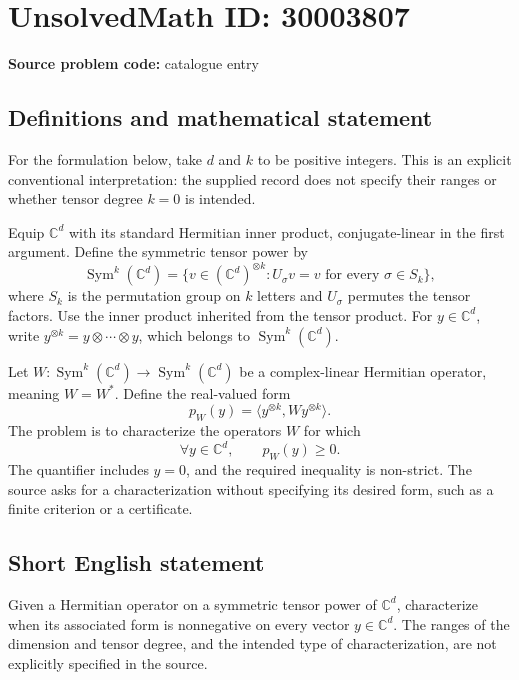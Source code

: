 \documentclass[11pt]{article}
\newcommand{\C}{\mathbb{C}}
\begin{document}
\section*{UnsolvedMath ID: 30003807}
\textbf{Source problem code:} catalogue entry
\subsection{Definitions and mathematical statement}
For the formulation below, take \(d\) and \(k\) to be positive integers. This is an explicit conventional interpretation: the supplied record does not specify their ranges or whether tensor degree \(k=0\) is intended.

Equip \(\C^d\) with its standard Hermitian inner product, conjugate-linear in the first argument. Define the symmetric tensor power by
\[
\operatorname{Sym}^k(\C^d)=\{v\in(\C^d)^{\otimes k}:U_\sigma v=v\text{ for every }\sigma\in S_k\},
\]
where \(S_k\) is the permutation group on \(k\) letters and \(U_\sigma\) permutes the tensor factors. Use the inner product inherited from the tensor product. For \(y\in\C^d\), write \(y^{\otimes k}=y\otimes\cdots\otimes y\), which belongs to \(\operatorname{Sym}^k(\C^d)\).

Let \(W:\operatorname{Sym}^k(\C^d)\to\operatorname{Sym}^k(\C^d)\) be a complex-linear Hermitian operator, meaning \(W=W^*\). Define the real-valued form
\[
p_W(y)=\bigl\langle y^{\otimes k},W y^{\otimes k}\bigr\rangle.
\]
The problem is to characterize the operators \(W\) for which
\[
\forall y\in\C^d,\qquad p_W(y)\geq 0.
\]
The quantifier includes \(y=0\), and the required inequality is non-strict. The source asks for a characterization without specifying its desired form, such as a finite criterion or a certificate.
\subsection{Short English statement}
Given a Hermitian operator on a symmetric tensor power of \(\C^d\), characterize when its associated form is nonnegative on every vector \(y\in\C^d\). The ranges of the dimension and tensor degree, and the intended type of characterization, are not explicitly specified in the source.
\end{document}
